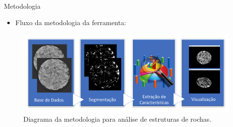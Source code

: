 \documentclass{beamer}
\begin{document}
\begin{frame}{Metodologia}
    \begin{itemize}
        \item Fluxo da metodologia da ferramenta:
    \end{itemize}
    
     \begin{figure}[!htb]
        \centering
        \includegraphics[width=12cm]{fig/descricao.pdf}\\
        \scriptsize{Diagrama da metodologia para análise de estruturas de rochas.}
        \label{fig:metodoMRX}
    \end{figure}
\end{frame}
\end{document}
